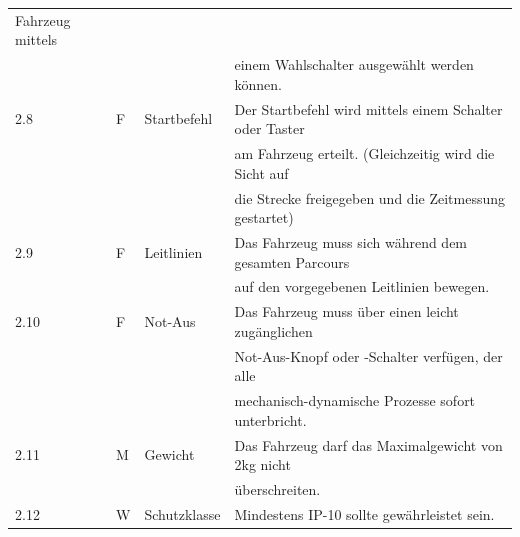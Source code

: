 \documentclass[../main.tex]{subfiles}
\begin{document}
\begin{tabular}{|l|l|l|l|}
  Fahrzeug mittels \\
  & & & einem Wahlschalter ausgewählt werden können. \\
  \hline
  2.8 & F & Startbefehl & Der Startbefehl wird mittels einem Schalter
  oder Taster \\
  & & & am Fahrzeug erteilt. (Gleichzeitig wird die Sicht auf \\
  & & & die Strecke freigegeben und die Zeitmessung gestartet) \\
  \hline
  2.9 & F & Leitlinien & Das Fahrzeug muss sich während dem gesamten Parcours \\
  & & & auf den vorgegebenen Leitlinien bewegen. \\
  \hline
  2.10 & F & Not-Aus & Das Fahrzeug muss über einen leicht zugänglichen \\
  & & & Not-Aus-Knopf oder -Schalter verfügen, der alle \\
  & & & mechanisch-dynamische Prozesse sofort unterbricht. \\
  \hline
  2.11 & M & Gewicht & Das Fahrzeug darf das Maximalgewicht von 2kg nicht \\
  & & & überschreiten. \\
  \hline
  2.12 & W & Schutzklasse & Mindestens IP-10 sollte gewährleistet sein. \\
  \hline
\end{tabular}

\newpage
\end{document}
